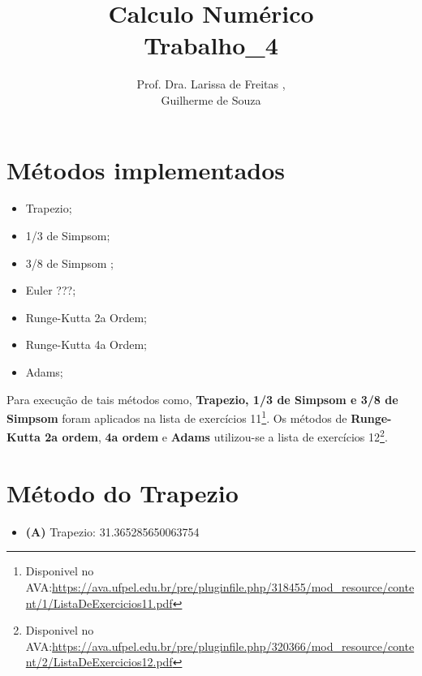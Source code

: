 \documentclass[12pt]{article}
\title{Calculo Numérico\\Trabalho\_4}
\author{Prof. Dra. Larissa de Freitas \inst{1},\\Guilherme de Souza\inst{1}}
\begin{document}
 

\maketitle
\br

\section{Métodos implementados}
\begin{itemize}
  \item Trapezio;
  \item 1/3 de Simpsom;
  \item 3/8 de Simpsom ;
  \item Euler ???;
  \item Runge-Kutta 2a Ordem;
  \item Runge-Kutta 4a Ordem;
  \item Adams;
\end{itemize}

Para execução de tais métodos como, \textbf{Trapezio, 1/3 de Simpsom e 3/8 de Simpsom} foram aplicados na lista de exercícios 11\footnote{Disponivel no AVA:\url{https://ava.ufpel.edu.br/pre/pluginfile.php/318455/mod_resource/content/1/ListaDeExercicios11.pdf}}. Os métodos de \textbf{Runge-Kutta 2a ordem}, \textbf{4a ordem} e \textbf{Adams} utilizou-se a lista de exercícios 12\footnote{Disponivel no AVA:\url{https://ava.ufpel.edu.br/pre/pluginfile.php/320366/mod_resource/content/2/ListaDeExercicios12.pdf}}.


\section{Método do Trapezio}

\begin{itemize}
    \item \textbf{(A)} Trapezio: 31.365285650063754
\end{itemize}
\end{document}
